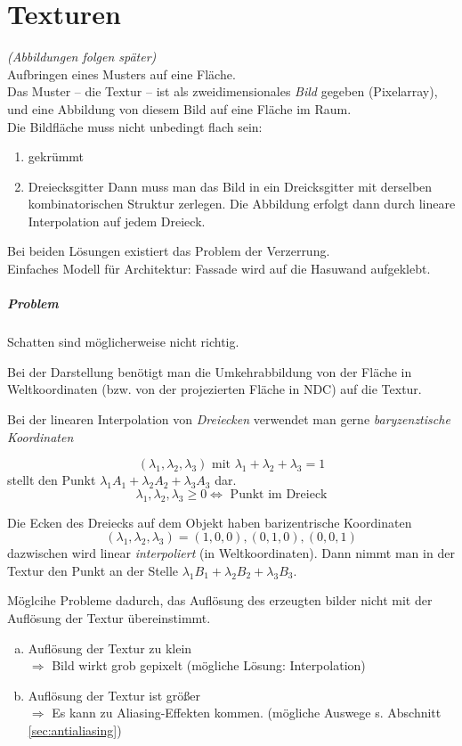\chapter{Texturen}
\emph{(Abbildungen folgen später)}\\
Aufbringen eines Musters auf eine Fläche.\\[1em]
Das Muster -- die Textur -- ist als zweidimensionales \emph{Bild} gegeben (Pixelarray), und eine Abbildung
von diesem Bild auf eine Fläche im Raum.\\[1em]
Die Bildfläche muss nicht unbedingt flach sein:
\begin{enumerate}
 \item gekrümmt %
 \item Dreiecksgitter %
	Dann muss man das Bild in ein Dreicksgitter mit derselben kombinatorischen Struktur zerlegen.
	Die Abbildung erfolgt dann durch lineare Interpolation auf jedem Dreieck.
\end{enumerate}
Bei beiden Lösungen existiert das Problem der Verzerrung.\\[1em]
Einfaches Modell für Architektur: Fassade wird auf die Hasuwand aufgeklebt.
\paragraph*{Problem} Schatten sind möglicherweise nicht richtig.

Bei der Darstellung benötigt man die Umkehrabbildung von der Fläche in Weltkoordinaten
(bzw. von der projezierten Fläche in NDC) auf die Textur.

Bei der linearen Interpolation von \emph{Dreiecken} verwendet man gerne \emph{baryzenztische Koordinaten}
\begin{center}
\end{center}
\[(\lambda_1, \lambda_2, \lambda_3) \text{ mit } \lambda_1 + \lambda_2 + \lambda_3 = 1\]
stellt den Punkt $\lambda_1 A_1 + \lambda_2 A_2 + \lambda_3 A_3$ dar.
\[\lambda_1, \lambda_2, \lambda_3 \ge 0 \Leftrightarrow \text{ Punkt im Dreieck}\]
\begin{center}
\end{center}
Die Ecken des Dreiecks auf dem Objekt haben barizentrische Koordinaten
\[(\lambda_1, \lambda_2, \lambda_3) = (1,0,0), (0,1,0), (0,0,1)\]
dazwischen wird linear \emph{interpoliert} (in Weltkoordinaten). Dann nimmt man in der Textur den Punkt an der
Stelle $\lambda_1 B_1 + \lambda_2 B_2 + \lambda_3 B_3$.
\begin{center}
\end{center}
Möglcihe Probleme dadurch, das Auflösung des erzeugten bilder nicht mit der Auflösung der Textur übereinstimmt.
\begin{enumerate}[a)]
 \item Auflösung der Textur zu klein\\
	$\Rightarrow$ Bild wirkt grob gepixelt (mögliche Lösung: Interpolation)
 \item Auflösung der Textur ist größer\\
	$\Rightarrow$ Es kann zu Aliasing-Effekten kommen. (mögliche Auswege s. Abschnitt \ref{sec:antialiasing})
\end{enumerate}


